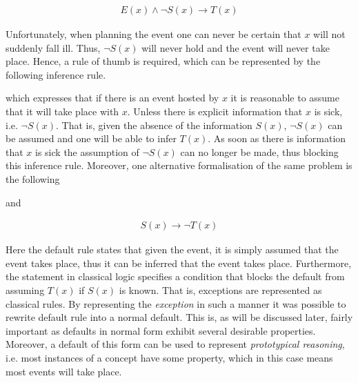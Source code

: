 \documentclass{article}
\begin{document}
\begin{equation*}
\begin{split}
E(x) \wedge  \neg S(x) \to T(x)
\end{split}
\end{equation*}

Unfortunately, when planning the event one can never be certain that $x$ will not suddenly fall ill. Thus, $\neg S(x)$ will never hold and the event will never take place.
Hence, a rule of thumb is required, which can be represented by the following inference rule.

\begin{prooftree}
\end{prooftree}

which expresses that if there is an event hosted by $x$ it is reasonable to assume that it will take place with $x$. Unless there is explicit information that $x$ is sick, i.e. $\neg S(x)$. That is, given the absence of the information $S(x)$, $\neg S(x)$ can be assumed and one will be able to infer $T(x)$. As soon as there is information that $x$ is sick the assumption of $\neg S(x)$ can no longer be made, thus blocking this inference rule. Moreover, one alternative formalisation of the same problem is the following


\begin{prooftree}
\end{prooftree}

and 

\begin{equation*}
\begin{split}
S(x) \to  \neg T(x)
\end{split}
\end{equation*}

Here the default rule states that given the event, it is simply assumed that the event takes place, thus it can be inferred that the event takes place. Furthermore, the statement in classical logic specifies a condition that blocks the default from assuming $T(x)$ if $S(x)$ is known. That is, exceptions are represented as classical rules. 
By representing the \emph{exception} in such a manner it was possible to rewrite default rule into a normal default. This is, as will be discussed later, fairly important as defaults in normal form exhibit several desirable properties. Moreover, a default of this form can be used to represent \emph{prototypical reasoning}, i.e. most instances of a concept have some property, which in this case means most events will take place. \cite{ANTONIOU2007517} \\
\end{document}
